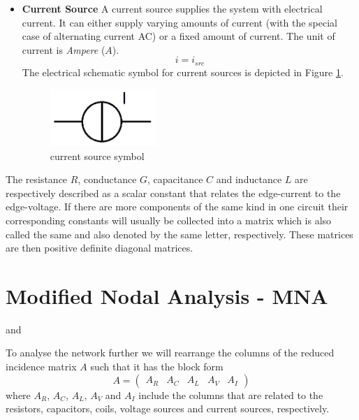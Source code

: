 \begin{itemize}
	\item \textbf{Current Source} \newline
	A current source supplies the system with electrical current. It can either supply varying amounts of current (with the special case of alternating current AC) or a fixed amount of current. The unit of current is \emph{Ampere} ($A$).
	\begin{equation}
		\label{eq:current source law}
		i = i_{src}
	\end{equation}
	The electrical schematic symbol for current sources is depicted in Figure \ref{fig:current source symbol}.
	\begin{figure}[H]
		\label{fig:current source symbol}
		\centering
		\includegraphics[width=4cm]{pictures/current_source.png}
		\caption{current source symbol}
	\end{figure}
\end{itemize}

The resistance $R$, conductance $G$, capacitance $C$ and inductance $L$ are respectively described as a scalar constant that relates the edge-current to the edge-voltage. If there are more components of the same kind in one circuit their corresponding constants will usually be collected into a matrix which is also called the same and also denoted by the same letter, respectively. These matrices are then positive definite diagonal matrices.

\section{Modified Nodal Analysis - MNA}
\label{sec:MNA}


\cite{ModellingAndDiscretizationOfCircuitProblems} and \cite{NumerikGewöhnlicherDifferentialgleichungen}

To analyse the network further we will rearrange the columns of the reduced incidence matrix $A$ such that it has the block form
\begin{displaymath}
	A = 
	\begin{pmatrix}
		A_R & A_C & A_L & A_V & A_I
	\end{pmatrix}
\end{displaymath}
where $A_R$, $A_C$, $A_L$, $A_V$ and $A_I$ include the columns that are related to the resistors, capacitors, coils, voltage sources and current sources, respectively.

